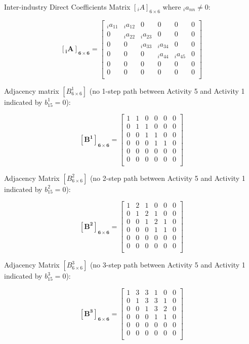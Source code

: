 \documentclass[
  letterpaper,
  DIV=11,
  numbers=noendperiod]{scrreprt}
\begin{document}
Inter-industry Direct Coefficients Matrix \([_{i}A]_{6\times 6}\) where
\(_{i}a_{nn}\neq{0}\):

\[\mathbf{[_{i}A]_{6\times 6}} = \left[\begin{array}
{rrr}
_{i}a_{11} & _{i}a_{12} & 0 & 0 & 0 & 0 \\
0 & _{i}a_{22} & _{i}a_{23} & 0 & 0 & 0 \\
0 & 0 & _{i}a_{33} & _{i}a_{34} & 0 & 0 \\
0 & 0 & 0 & _{i}a_{44} & _{i}a_{45} & 0 \\
0 & 0 & 0 & 0 & 0 & 0 \\
0 & 0 & 0 & 0 & 0 & 0 \\
\end{array}\right]
\]

Adjacency matrix \([B^{1}_{6\times 6}]\) (no 1-step path between
Activity 5 and Activity 1 indicated by \(b^{1}_{15}=0\)):

\[\mathbf{[B^{1}]_{6\times 6}} = \left[\begin{array}
{rrr}
1 & 1 & 0 & 0 & 0 & 0 \\
0 & 1 & 1 & 0 & 0 & 0 \\
0 & 0 & 1 & 1 & 0 & 0 \\
0 & 0 & 0 & 1 & 1 & 0 \\
0 & 0 & 0 & 0 & 0 & 0 \\
0 & 0 & 0 & 0 & 0 & 0 \\
\end{array}\right]
\]

Adjacency Matrix \([B^{2}_{6\times 6}]\) (no 2-step path between
Activity 5 and Activity 1 indicated by \(b^{2}_{15}=0\)):

\[\mathbf{[B^{2}]_{6\times 6}} = \left[\begin{array}
{rrr}
1 & 2 & 1 & 0 & 0 & 0 \\
0 & 1 & 2 & 1 & 0 & 0 \\
0 & 0 & 1 & 2 & 1 & 0 \\
0 & 0 & 0 & 1 & 1 & 0 \\
0 & 0 & 0 & 0 & 0 & 0 \\
0 & 0 & 0 & 0 & 0 & 0 \\
\end{array}\right]
\]

Adjacency Matrix \([B^{3}_{6\times 6}]\) (no 3-step path between
Activity 5 and Activity 1 indicated by \(b^{3}_{15}=0\)):

\[\mathbf{[B^{3}]_{6\times 6}} = \left[\begin{array}
{rrr}
1 & 3 & 3 & 1 & 0 & 0 \\
0 & 1 & 3 & 3 & 1 & 0 \\
0 & 0 & 1 & 3 & 2 & 0 \\
0 & 0 & 0 & 1 & 1 & 0 \\
0 & 0 & 0 & 0 & 0 & 0 \\
0 & 0 & 0 & 0 & 0 & 0 \\
\end{array}\right]
\]
\end{document}
